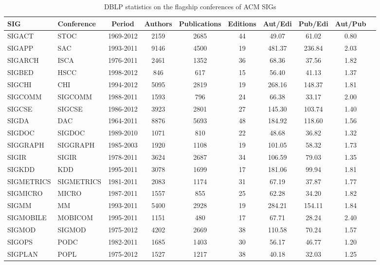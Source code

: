 \documentclass[letterpaper]{www13-companion-accepted}
\begin{document}
\begin{table}[!htb]
\centering
\caption{DBLP statistics on the flagship conferences of ACM SIGs}
\label{tab:sigs_conference_period}
{\small
\begin{tabular}{|l|l|c|c|c|c|c|c|c|c|} \hline
\bf{SIG} & \bf{Conference} & \bf{Period} & \bf{Authors} & \bf{Publications} & \bf{Editions} & \bf{Aut/Edi} & \bf{Pub/Edi} & \bf{Aut/Pub}\\ \hline
SIGACT & STOC & 1969-2012 & 2159 & 2685 & 44 & 49.07 & 61.02 & 0.80\\ \hline
SIGAPP & SAC & 1993-2011 & 9146 & 4500 & 19 & 481.37 & 236.84 & 2.03\\ \hline
SIGARCH & ISCA & 1976-2011 & 2461 & 1352 & 36 & 68.36 & 37.56 & 1.82\\ \hline
SIGBED & HSCC & 1998-2012 & 846 & 617 & 15 & 56.40 & 41.13 & 1.37\\ \hline
SIGCHI & CHI & 1994-2012 & 5095 & 2819 & 19 & 268.16 & 148.37 & 1.81\\ \hline
SIGCOMM & SIGCOMM & 1988-2011 & 1593 & 796 & 24 & 66.38 & 33.17 & 2.00\\ \hline
SIGCSE & SIGCSE & 1986-2012 & 3923 & 2801 & 27 & 145.30 & 103.74 & 1.40\\ \hline
SIGDA & DAC & 1964-2011 & 8876 & 5693 & 48 & 184.92 & 118.60 & 1.56\\ \hline
SIGDOC & SIGDOC & 1989-2010 & 1071 & 810 & 22 & 48.68 & 36.82 & 1.32\\ \hline
SIGGRAPH & SIGGRAPH & 1985-2003 & 1920 & 1108 & 19 & 101.05 & 58.32 & 1.73\\ \hline
SIGIR & SIGIR & 1978-2011 & 3624 & 2687 & 34 & 106.59 & 79.03 & 1.35\\ \hline
SIGKDD & KDD & 1995-2011 & 3078 & 1699 & 17 & 181.06 & 99.94 & 1.81\\ \hline
SIGMETRICS & SIGMETRICS & 1981-2011 & 2083 & 1174 & 31 & 67.19 & 37.87 & 1.77\\ \hline
SIGMICRO & MICRO & 1987-2011 & 1557 & 855 & 25 & 62.28 & 34.20 & 1.82\\ \hline
SIGMM & MM & 1993-2011 & 5400 & 2928 & 19 & 284.21 & 154.11 & 1.84\\ \hline
SIGMOBILE & MOBICOM & 1995-2011 & 1151 & 480 & 17 & 67.71 & 28.24 & 2.40\\ \hline
SIGMOD & SIGMOD & 1975-2012 & 4202 & 2669 & 38 & 110.58 & 70.24 & 1.57\\ \hline
SIGOPS & PODC & 1982-2011 & 1685 & 1403 & 30 & 56.17 & 46.77 & 1.20\\ \hline
SIGPLAN & POPL & 1975-2012 & 1527 & 1217 & 38 & 40.18 & 32.03 & 1.25\\ \hline

\end{tabular}}
\end{table}
\end{document}
